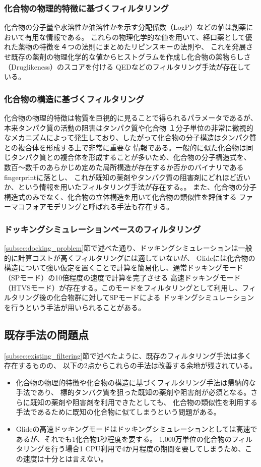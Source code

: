 \subsubsection{化合物の物理的特徴に基づくフィルタリング}
化合物の分子量や水溶性か油溶性かを示す分配係数（LogP）などの値は創薬において有用な情報である。
これらの物理化学的な値を用いて、経口薬として優れた薬物の特徴を４つの法則にまとめたリピンスキーの法則\cite{Lipinski1997}や、
これを発展させ既存の薬剤の物理化学的な値からヒストグラムを作成し化合物の薬物らしさ（Druglikeness）のスコアを付ける
QED\cite{Bickerton2012}などのフィルタリング手法が存在している。
\subsubsection{化合物の構造に基づくフィルタリング}
化合物の物理的特徴は物質を巨視的に見ることで得られるパラメータであるが、本来タンパク質の活動の阻害はタンパク質や化合物
１分子単位の非常に微視的なメカニズムによって発生しており、したがって化合物の分子構造はタンパク質との複合体を形成する上で非常に重要な
情報である。一般的に似た化合物は同じタンパク質との複合体を形成することが多いため、化合物の分子構造式を、
数百～数千のあらかじめ定めた局所構造が存在するか否かのバイナリであるfingerprintに落とし、
これが既知の薬剤やタンパク質の阻害剤にどれほど近いか、という情報を用いたフィルタリング手法が存在する。\cite{Nilakantan1993}。
また、化合物の分子構造式のみでなく、化合物の立体構造を用いて化合物の類似性を評価する
ファーマコフォアモデリングと呼ばれる手法も存在する\cite{Parenti2003}。
\subsubsection{ドッキングシミュレーションベースのフィルタリング}
\ref{subsec:docking_problem}節で述べた通り、ドッキングシミュレーションは一般的に計算コストが高くフィルタリングには適していないが、
Glideには化合物の構造について強い仮定を置くことで計算を簡易化し、通常ドッキングモード（SPモード）の10倍程度の速度で計算を完了させる
高速ドッキングモード（HTVSモード）が存在する。このモードをフィルタリングとして利用し、フィルタリング後の化合物群に対してSPモードによる
ドッキングシミュレーションを行うという手法が用いられることがある\cite{Fujimoto2008}。

\subsection{既存手法の問題点}
\ref{subsec:existing_filtering}節で述べたように、既存のフィルタリング手法は多く存在するものの、
以下の2点からこれらの手法は改善する余地が残されている。
\begin{itemize}
\item 化合物の物理的特徴や化合物の構造に基づくフィルタリング手法は帰納的な手法であり、
	標的タンパク質を狙った既知の薬剤や阻害剤が必須となる。さらに既知の薬剤や阻害剤を利用できたとしても、
	化合物の類似性を利用する手法であるために既知の化合物に似てしまうという問題がある。	
\item Glideの高速ドッキングモードはドッキングシミュレーションとしては高速であるが、それでも1化合物1秒程度を要する。
	1,000万単位の化合物のフィルタリングを行う場合1 CPU利用で4か月程度の期間を要してしまうため、この速度は十分とは言えない。
\end{itemize}

